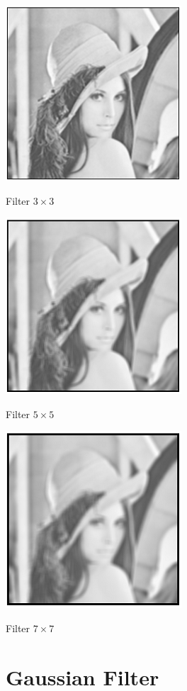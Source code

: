 \begin{center}
	\includegraphics{a3x3.png}
	
	Filter $3\times3$
	
	 \includegraphics{a5x5.png}
	
	Filter $5\times5$
	
		\includegraphics{a7x7.png}
	
Filter $7\times7$
\end{center}

\section{Gaussian Filter}

